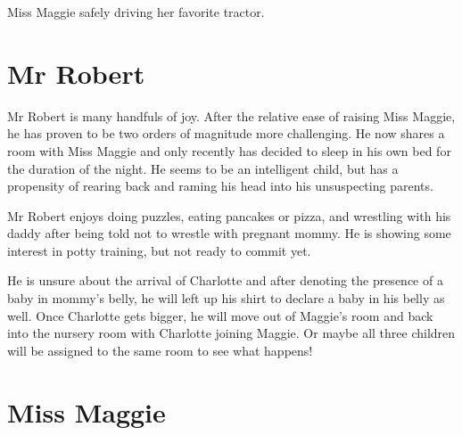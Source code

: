 \documentclass[letterpaper,11pt]{article}
\makeatletter
\newenvironment{figurehere}
  {\def\@captype{figure}}
  {}
\makeatother
\begin{document}
\begin{multicols}{2}
\bigskip

\begin{figurehere}
 \centering   
 \caption{Miss Maggie safely driving her favorite tractor.}
\end{figurehere}

\section{Mr Robert}

Mr Robert is many handfuls of joy.  After the relative ease of raising Miss
Maggie, he has proven to be two orders of magnitude more challenging.  He now
shares a room with Miss Maggie and only recently has decided to sleep in his own
bed for the duration of the night. He seems to be an intelligent child, but has
a propensity of rearing back and raming his head into his unsuspecting parents. 

Mr Robert enjoys doing puzzles, eating pancakes or pizza, and wrestling with his
daddy after being told not to wrestle with pregnant mommy.  He is showing some
interest in potty training, but not ready to commit yet.

He is unsure about the arrival of Charlotte and after denoting the presence of a
baby in mommy's belly, he will left up his shirt to declare a baby in his belly
as well.  Once Charlotte gets bigger, he will move out of Maggie's room and back
into the nursery room with Charlotte joining Maggie.  Or maybe all three
children will be assigned to the same room to see what happens!

\section{Miss Maggie}


\end{multicols}
\end{document}

